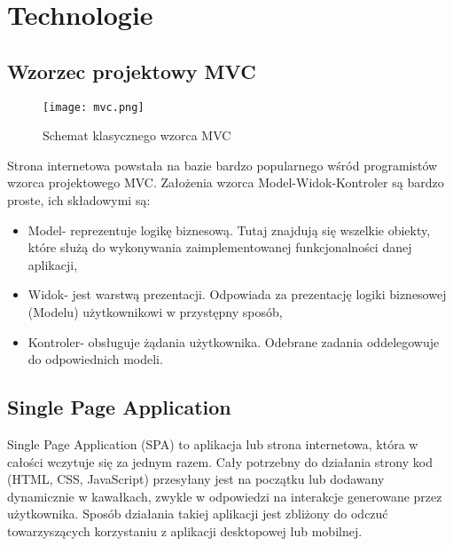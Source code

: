 \section{Technologie}
\subsection{Wzorzec projektowy MVC}
\begin{figure}[H]
	\centering
	\texttt{[image: mvc.png]}
	\caption{Schemat klasycznego wzorca MVC}
	\label{fig:schemat_mvc}
\end{figure}
Strona internetowa powstała na bazie bardzo popularnego wśród programistów wzorca projektowego MVC. Założenia wzorca Model-Widok-Kontroler są bardzo proste, ich składowymi są:
\begin{itemize}
\item Model- reprezentuje logikę biznesową. Tutaj znajdują się wszelkie obiekty, które służą do wykonywania zaimplementowanej funkcjonalności danej aplikacji,
\item Widok- jest warstwą prezentacji. Odpowiada za prezentację logiki biznesowej (Modelu) użytkownikowi w przystępny sposób,
\item Kontroler- obsługuje żądania użytkownika. Odebrane zadania oddelegowuje do odpowiednich modeli.
\end{itemize}

\subsection{Single Page Application}
Single Page Application (SPA) to aplikacja lub strona internetowa, która w całości wczytuje się za jednym razem. Cały potrzebny do działania strony kod (HTML, CSS, JavaScript) przesyłany jest na początku lub dodawany dynamicznie w kawałkach, zwykle w odpowiedzi na interakcje generowane przez użytkownika.
Sposób działania takiej aplikacji jest zbliżony do odczuć towarzyszących korzystaniu z aplikacji desktopowej lub mobilnej.

